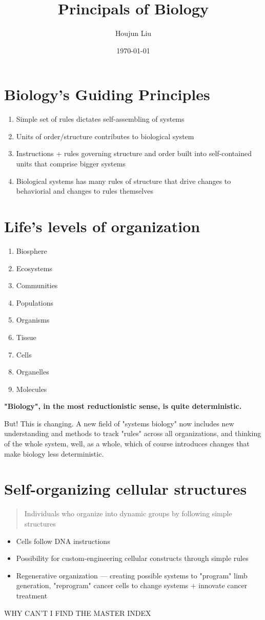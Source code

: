 \documentclass[letterpaper]{article}
\author{Houjun Liu}
\date{\today}
\title{Principals of Biology}
\renewcommand{\tableofcontents}{}
\begin{document}
\tableofcontents



\section{Biology's Guiding Principles}
\label{sec:orga738d48}
\begin{enumerate}
\item Simple set of rules dictates self-assembling of systems
\item Units of order/structure contributes to biological system
\item Instructions + rules governing structure and order built into
self-contained units that comprise bigger systems
\item Biological systems has many rules of structure that drive changes to
behaviorial and changes to rules themselves
\end{enumerate}

\section{Life's levels of organization}
\label{sec:orgb4ef080}
\begin{enumerate}
\item Biosphere
\item Ecosystems
\item Communities
\item Populations
\item Organisms
\item Tissue
\item Cells
\item Organelles
\item Molecules
\end{enumerate}

\textbf{"Biology", in the most reductionistic sense, is quite deterministic.}

But! This is changing. A new field of "systems biology" now includes new
understanding and methods to track "rules" across all organizations, and
thinking of the whole system, well, as a whole, which of course
introduces changes that make biology less deterministic.

\section{Self-organizing cellular structures}
\label{sec:org1bd31ef}
\begin{quote}
Individuals who organize into dynamic groups by following simple
structures
\end{quote}

\begin{itemize}
\item Cells follow DNA instructions
\item Possibility for custom-engineering cellular constructs through simple
rules
\item Regenerative organization --- creating possible systems to "program"
limb generation, "reprogram" cancer cells to change systems + innovate
cancer treatment
\end{itemize}

WHY CAN'T I FIND THE MASTER INDEX
\end{document}
